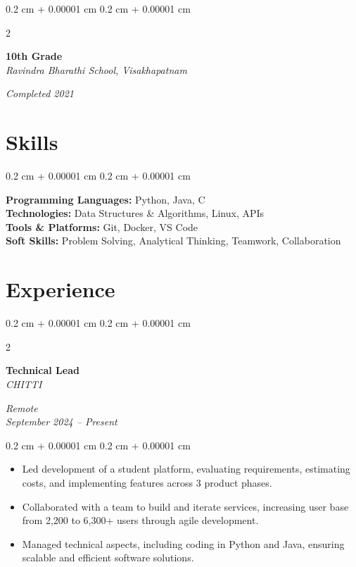 \documentclass[10pt, letterpaper]{article}
\newenvironment{highlights}{
    \begin{itemize}[
        topsep=0.10 cm,
        parsep=0.10 cm,
        partopsep=0pt,
        itemsep=0pt,
        leftmargin=0.4 cm + 10pt
    ]
}{
    \end{itemize}
} %
\newenvironment{onecolentry}{
    \begin{adjustwidth}{
        0.2 cm + 0.00001 cm
    }{
        0.2 cm + 0.00001 cm
    }
}{
    \end{adjustwidth}
} %
\newenvironment{twocolentry}[2][]{
    \onecolentry
    \def\secondColumn{#2}
    \setcolumnwidth{\fill, 4.5 cm}
    \begin{paracol}{2}
}{
    \switchcolumn \raggedleft \secondColumn
    \end{paracol}
    \endonecolentry
} %
\begin{document}
    \vspace{0.10 cm}
    \begin{twocolentry}{
        \textit{Completed 2021}
    }
        \textbf{10th Grade} \\
        \textit{Ravindra Bharathi School, Visakhapatnam}
    \end{twocolentry}

    \section{Skills}
    \begin{onecolentry}
        \textbf{Programming Languages:} Python, Java, C \\
        \textbf{Technologies:} Data Structures \& Algorithms, Linux, APIs \\
        \textbf{Tools \& Platforms:} Git, Docker, VS Code \\
        \textbf{Soft Skills:} Problem Solving, Analytical Thinking, Teamwork, Collaboration
    \end{onecolentry}

    \section{Experience}
    \begin{twocolentry}{
        \textit{Remote} \\
        \textit{September 2024 – Present}
    }
        \textbf{Technical Lead} \\
        \textit{CHITTI}
    \end{twocolentry}
    \vspace{0.10 cm}
    \begin{onecolentry}
        \begin{highlights}
            \item Led development of a student platform, evaluating requirements, estimating costs, and implementing features across 3 product phases.
            \item Collaborated with a team to build and iterate services, increasing user base from 2,200 to 6,300+ users through agile development.
            \item Managed technical aspects, including coding in Python and Java, ensuring scalable and efficient software solutions.
        \end{highlights}
    \end{onecolentry}
\end{document}
